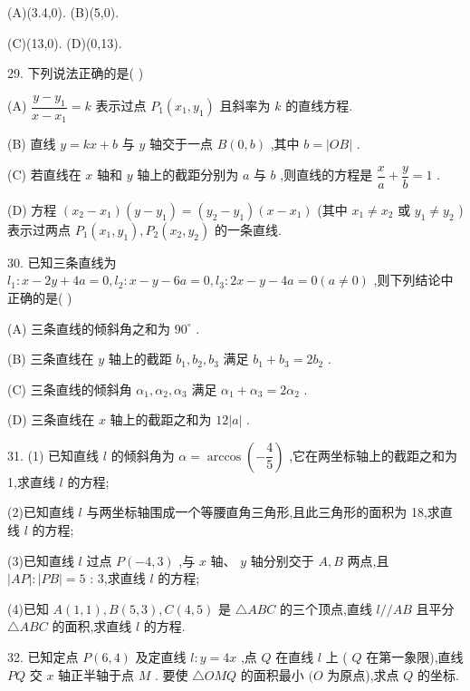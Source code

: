 (A)(3.4,0). (B)(5,0).

(C)(13,0). (D)(0,13).

29. 下列说法正确的是(   )

(A) $\dfrac{y - {y}_{1}}{x - {x}_{1}} = k$ 表示过点 ${P}_{1}\left( {{x}_{1},{y}_{1}}\right)$ 且斜率为 $k$ 的直线方程.

(B) 直线 $y = {kx} + b$ 与 $y$ 轴交于一点 $B\left( {0,b}\right)$ ,其中 $b = \left| {OB}\right|$ .

(C) 若直线在 $x$ 轴和 $y$ 轴上的截距分别为 $a$ 与 $b$ ,则直线的方程是 $\dfrac{x}{a} + \dfrac{y}{b} = 1$ .

(D) 方程 $\left( {{x}_{2} - {x}_{1}}\right) \left( {y - {y}_{1}}\right)  = \left( {{y}_{2} - {y}_{1}}\right) \left( {x - {x}_{1}}\right)$ (其中 ${x}_{1} \neq  {x}_{2}$ 或 ${y}_{1} \neq  {y}_{2}$ ) 表示过两点 ${P}_{1}\left( {{x}_{1},{y}_{1}}\right) ,{P}_{2}\left( {{x}_{2},{y}_{2}}\right)$ 的一条直线.

30. 已知三条直线为 ${l}_{1} : x - {2y} + {4a} = 0,{l}_{2} : x - y - {6a} = 0,{l}_{3} : {2x} - y - {4a} = 0\left( {a \neq  0}\right)$ ,则下列结论中正确的是(   )

(A) 三条直线的倾斜角之和为 ${90}^{ \circ  }$ .

(B) 三条直线在 $y$ 轴上的截距 ${b}_{1},{b}_{2},{b}_{3}$ 满足 ${b}_{1} + {b}_{3} = 2{b}_{2}$ .

(C) 三条直线的倾斜角 ${\alpha }_{1},{\alpha }_{2},{\alpha }_{3}$ 满足 ${\alpha }_{1} + {\alpha }_{3} = 2{\alpha }_{2}$ .

(D) 三条直线在 $x$ 轴上的截距之和为 ${12}\left| a\right|$ .

31. (1) 已知直线 $l$ 的倾斜角为 $\alpha  = \arccos \left( {-\dfrac{4}{5}}\right)$ ,它在两坐标轴上的截距之和为 1,求直线 $l$ 的方程;

(2)已知直线 $l$ 与两坐标轴围成一个等腰直角三角形,且此三角形的面积为 18,求直线 $l$ 的方程;

(3)已知直线 $l$ 过点 $P\left( {-4,3}\right)$ ,与 $x$ 轴、 $y$ 轴分别交于 $A,B$ 两点,且 $\left| {AP}\right|  : \left| {PB}\right|  = 5$ : 3,求直线 $l$ 的方程;

(4)已知 $A\left( {1,1}\right) ,B\left( {5,3}\right) ,C\left( {4,5}\right)$ 是 $\bigtriangleup {ABC}$ 的三个顶点,直线 $l//{AB}$ 且平分 $\bigtriangleup {ABC}$ 的面积,求直线 $l$ 的方程.

32. 已知定点 $P\left( {6,4}\right)$ 及定直线 $l : y = {4x}$ ,点 $Q$ 在直线 $l$ 上 ( $Q$ 在第一象限),直线 ${PQ}$ 交 $x$ 轴正半轴于点 $M$ . 要使 $\bigtriangleup {OMQ}$ 的面积最小 $(O$ 为原点),求点 $Q$ 的坐标.

